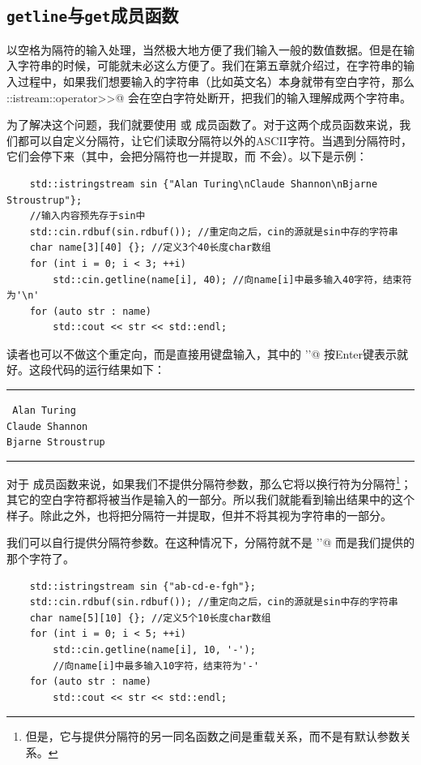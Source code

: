 \subsection*{\texttt{getline}与\texttt{get}成员函数}
以空格为隔符的输入处理，当然极大地方便了我们输入一般的数值数据。但是在输入字符串的时候，可能就未必这么方便了。我们在第五章就介绍过，在字符串的输入过程中，如果我们想要输入的字符串（比如英文名）本身就带有空白字符，那么 \lstinline@std::istream::operator>>@ 会在空白字符处断开，把我们的输入理解成两个字符串。\par
为了解决这个问题，我们就要使用 \lstinline@getline@ 或 \lstinline@get@ 成员函数了。对于这两个成员函数来说，我们都可以自定义分隔符，让它们读取分隔符以外的ASCII字符。当遇到分隔符时，它们会停下来（其中，\lstinline@getline@ 会把分隔符也一并提取，而 \lstinline@get@ 不会）。以下是示例：
\begin{lstlisting}
    std::istringstream sin {"Alan Turing\nClaude Shannon\nBjarne Stroustrup"};
    //输入内容预先存于sin中
    std::cin.rdbuf(sin.rdbuf()); //重定向之后，cin的源就是sin中存的字符串
    char name[3][40] {}; //定义3个40长度char数组
    for (int i = 0; i < 3; ++i)
        std::cin.getline(name[i], 40); //向name[i]中最多输入40字符，结束符为'\n'
    for (auto str : name)
        std::cout << str << std::endl;
\end{lstlisting}
读者也可以不做这个重定向，而是直接用键盘输入，其中的 \lstinline@'\n'@ 按Enter键表示就好。这段代码的运行结果如下：\\\noindent\rule{\linewidth}{.2pt}\texttt{
Alan Turing\\
Claude Shannon\\
Bjarne Stroustrup
}\\\noindent\rule{\linewidth}{.2pt}\par
对于 \lstinline@getline@ 成员函数来说，如果我们不提供分隔符参数，那么它将以换行符为分隔符\footnote{但是，它与提供分隔符的另一同名函数之间是重载关系，而不是有默认参数关系。}；其它的空白字符都将被当作是输入的一部分。所以我们就能看到输出结果中的这个样子。除此之外，\lstinline@getline@ 也将把分隔符一并提取，但并不将其视为字符串的一部分。\par
我们可以自行提供分隔符参数。在这种情况下，分隔符就不是 \lstinline@'\n'@ 而是我们提供的那个字符了。
\begin{lstlisting}
    std::istringstream sin {"ab-cd-e-fgh"};
    std::cin.rdbuf(sin.rdbuf()); //重定向之后，cin的源就是sin中存的字符串
    char name[5][10] {}; //定义5个10长度char数组
    for (int i = 0; i < 5; ++i)
        std::cin.getline(name[i], 10, '-');
        //向name[i]中最多输入10字符，结束符为'-'
    for (auto str : name)
        std::cout << str << std::endl;
\end{lstlisting}
